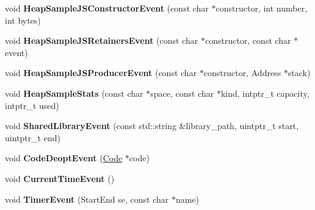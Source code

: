 \begin{DoxyCompactItemize}
\item 
\hypertarget{classv8_1_1internal_1_1_logger_a18eb1c23722508fbbd8ba64951ccd677}{}void {\bfseries Heap\+Sample\+J\+S\+Constructor\+Event} (const char $\ast$constructor, int number, int bytes)\label{classv8_1_1internal_1_1_logger_a18eb1c23722508fbbd8ba64951ccd677}

\item 
\hypertarget{classv8_1_1internal_1_1_logger_a322eebc4f841da47ae4392d7fd452f97}{}void {\bfseries Heap\+Sample\+J\+S\+Retainers\+Event} (const char $\ast$constructor, const char $\ast$event)\label{classv8_1_1internal_1_1_logger_a322eebc4f841da47ae4392d7fd452f97}

\item 
\hypertarget{classv8_1_1internal_1_1_logger_ad8e5169e654b8f122eca82f69e184f05}{}void {\bfseries Heap\+Sample\+J\+S\+Producer\+Event} (const char $\ast$constructor, Address $\ast$stack)\label{classv8_1_1internal_1_1_logger_ad8e5169e654b8f122eca82f69e184f05}

\item 
\hypertarget{classv8_1_1internal_1_1_logger_a916fdfb226cd57687bca72dae69f2a58}{}void {\bfseries Heap\+Sample\+Stats} (const char $\ast$space, const char $\ast$kind, intptr\+\_\+t capacity, intptr\+\_\+t used)\label{classv8_1_1internal_1_1_logger_a916fdfb226cd57687bca72dae69f2a58}

\item 
\hypertarget{classv8_1_1internal_1_1_logger_a0325e61aab9d26385fa4fc3fc6daff42}{}void {\bfseries Shared\+Library\+Event} (const std\+::string \&library\+\_\+path, uintptr\+\_\+t start, uintptr\+\_\+t end)\label{classv8_1_1internal_1_1_logger_a0325e61aab9d26385fa4fc3fc6daff42}

\item 
\hypertarget{classv8_1_1internal_1_1_logger_a60a1ff7a67ae400cd7cb77c9d868720c}{}void {\bfseries Code\+Deopt\+Event} (\hyperlink{classv8_1_1internal_1_1_code}{Code} $\ast$code)\label{classv8_1_1internal_1_1_logger_a60a1ff7a67ae400cd7cb77c9d868720c}

\item 
\hypertarget{classv8_1_1internal_1_1_logger_aa0a465dbed17a0793a716223c0feaecf}{}void {\bfseries Current\+Time\+Event} ()\label{classv8_1_1internal_1_1_logger_aa0a465dbed17a0793a716223c0feaecf}

\item 
\hypertarget{classv8_1_1internal_1_1_logger_a9e1006be8887830cb167c3080a509b71}{}void {\bfseries Timer\+Event} (Start\+End se, const char $\ast$name)\label{classv8_1_1internal_1_1_logger_a9e1006be8887830cb167c3080a509b71}


\end{DoxyCompactItemize}
